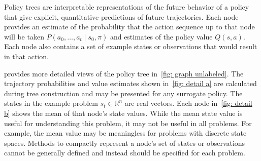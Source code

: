 \documentclass[letterpaper]{article} %
\begin{document}
Policy trees are interpretable representations of the future behavior of a policy that give explicit, quantitative predictions of future trajectories.
Each node provides an estimate of the probability that the action sequence up to that node will be taken $P(a_0, \dots, a_t \mid s_0, \pi)$ and estimates of the policy value $Q(s, a)$.
Each node also contains a set of example states or observations that would result in that action.

 provides more detailed views of the policy tree in~\cref{fig: graph unlabeled}.
The trajectory probabilities and value estimates shown in~\cref{fig: detail a} are calculated during tree construction and may be presented for any surrogate policy.
The states in the example problem $s_t \in \mathbb{R}^{n}$ are real vectors.
Each node in~\cref{fig: detail b} shows the mean of that node's state values.
While the mean state value is useful for understanding this problem, it may not be useful in all problems.
For example, the mean value may be meaningless for problems with discrete state spaces.
Methods to compactly represent a node's set of states or observations cannot be generally defined and instead should be specified for each problem.
\end{document}
